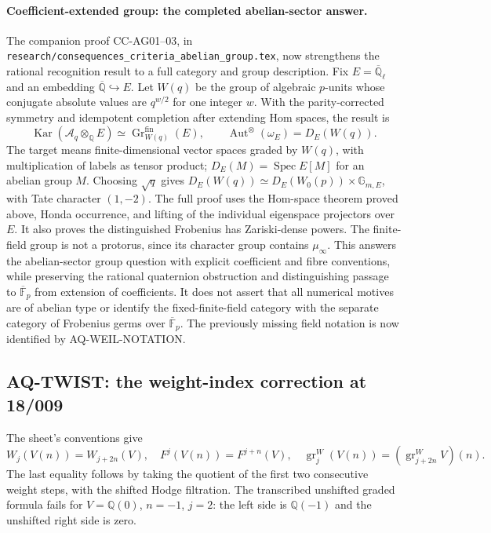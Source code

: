 \documentclass[11pt,a4paper]{article}
\theoremstyle{definition}\newtheorem{definition}[theorem]{Definition}
\theoremstyle{remark}\newtheorem{remark}[theorem]{Remark}
\begin{document}
\paragraph{Coefficient-extended group: the completed abelian-sector answer.}
The companion proof CC-AG01--03, in
\texttt{research/consequences\_criteria\_abelian\_group.tex},
now strengthens the rational recognition result to a full
category and group description. Fix
$E=\overline{\mathbb Q}_\ell$ and an embedding
$\overline{\mathbb Q}\hookrightarrow E$. Let $W(q)$ be the
group of algebraic $p$-units whose conjugate absolute values
are $q^{w/2}$ for one integer $w$. With the parity-corrected
symmetry and idempotent completion after extending Hom spaces,
the result is
\[
 \operatorname{Kar}(\mathcal A_q\otimes_{\mathbb Q}E)
  \simeq \operatorname{Gr}^{\mathrm{fin}}_{W(q)}(E),\qquad
 \operatorname{Aut}^{\otimes}(\omega_E)=D_E(W(q)).
\]
The target means finite-dimensional vector spaces graded by
$W(q)$, with multiplication of labels as tensor product;
$D_E(M)=\operatorname{Spec}E[M]$ for an abelian group $M$.
Choosing $\sqrt q$ gives
$D_E(W(q))\simeq D_E(W_0(p))\times\mathbb G_{m,E}$,
with Tate character $(1,-2)$. The full proof uses the
Hom-space theorem proved above, Honda occurrence, and
lifting of the individual eigenspace projectors over $E$.
It also proves the distinguished Frobenius has Zariski-dense
powers. The finite-field group is not a protorus, since its
character group contains $\mu_\infty$. This answers the
abelian-sector group question with explicit coefficient and
fibre conventions, while preserving the rational quaternion
obstruction and distinguishing passage to
$\overline{\mathbb F}_p$ from extension of coefficients.
It does not assert that all numerical motives are of
abelian type or identify the fixed-finite-field category
with the separate category of Frobenius germs over
$\overline{\mathbb F}_p$.  The previously missing field
notation is now identified by AQ-WEIL-NOTATION.

\subsection{AQ-TWIST: the weight-index correction at 18/009}
The sheet's conventions give
\[
 W_j(V(n))=W_{j+2n}(V),\quad F^j(V(n))=F^{j+n}(V),\quad
 \operatorname{gr}^W_j(V(n))
 =(\operatorname{gr}^W_{j+2n}V)(n).                             \tag{AQ.6}
\]
The last equality follows by taking the quotient of the
first two consecutive weight steps, with the shifted Hodge
filtration. The transcribed unshifted graded formula fails
for $V=\mathbb Q(0)$, $n=-1$, $j=2$: the left side is
$\mathbb Q(-1)$ and the unshifted right side is zero.
\end{document}
